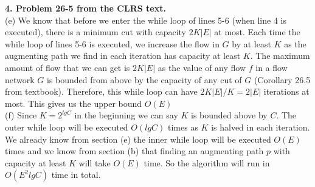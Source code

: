 \documentclass{article}
\begin{document}
\noindent \textbf{4. Problem 26-5 from the CLRS text.} \\
\noindent
\newline
(e) We know that before we enter the while loop of lines 5-6 (when line 4 is executed), there is a minimum cut with capacity $2K|E|$ at most. Each time the while loop of lines 5-6 is executed, we increase the flow in $G$ by at least $K$ as the augmenting path we find in each iteration has capacity at least $K$. The maximum amount of flow that we can get is $2K|E|$ as the value of any flow $f$ in a flow network $G$ is bounded from above by the capacity of any cut of $G$ (Corollary 26.5 from textbook). Therefore, this while loop can have $2K|E| / K = 2|E|$ iterations at most. This gives us the upper bound $O(E)$
\newline 
\\
(f) Since $K = 2^{lgC}$ in the beginning we can say $K$ is bounded above by $C$. The outer while loop will be executed $O(lgC)$ times as $K$ is halved in each iteration. We already know from section (e) the inner while loop will be executed $O(E)$ times and we know from section (b) that finding an augmenting path $p$ with capacity at least $K$ will take $O(E)$ time. So the algorithm will run in $O(E^2lgC)$ time in total.
\end{document}

